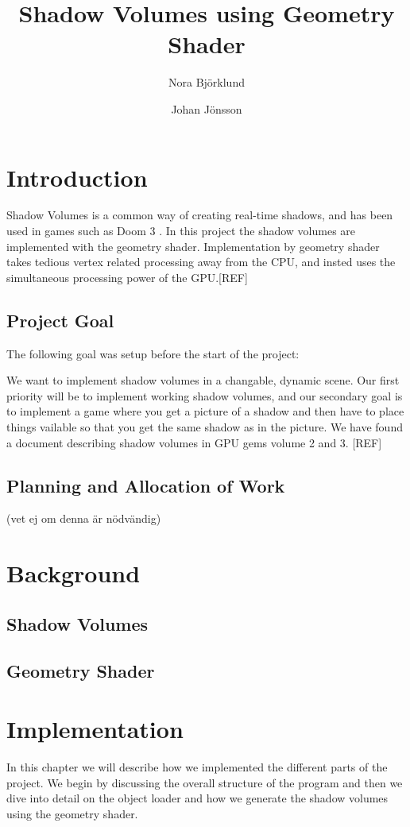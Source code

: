 \documentclass[a4paper, 12pt]{article}
\title{Shadow Volumes using Geometry Shader}
\author{Nora Björklund \and Johan Jönsson}
\begin{document}
\maketitle
\tableofcontents
\newpage
\section{Introduction}
Shadow Volumes is a common way of creating real-time shadows, and has been used
in games such as Doom 3 \cite{gpug1}. In this project the shadow volumes are implemented with the geometry shader. Implementation by geometry shader takes tedious vertex related processing away from the CPU, and insted uses the simultaneous processing power of the GPU.[REF]
\subsection{Project Goal}
The following goal was setup before the start of the project:
\begin{displayquote}
We want to implement shadow volumes in a changable, dynamic scene. Our first priority will be to implement working shadow volumes, and our secondary goal is to implement a game where you get a picture of a shadow and then have to place things vailable so that you get the same shadow as in the picture. We have found a document describing shadow volumes in GPU gems volume 2 and 3. [REF]
\end{displayquote}
\subsection{Planning and Allocation of Work}
(vet ej om denna är nödvändig)
\section{Background}
\subsection{Shadow Volumes}
\subsection{Geometry Shader}
\section{Implementation}
In this chapter we will describe how we implemented the different parts of the
project. We begin by discussing the overall structure of the program and then we
dive into detail on the object loader and how we generate the shadow volumes
using the geometry shader.
\end{document}
